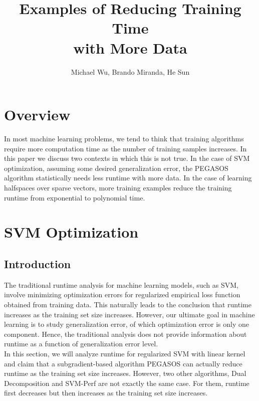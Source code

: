 \documentclass[11pt,a4paper]{article}
\title{Examples of Reducing Training Time\\ with More Data}
\author{Michael Wu, Brando Miranda, He Sun}
\begin{document}
\maketitle

\section{Overview}

	In most machine learning problems, we tend to think that training algorithms require more computation time as the number of training samples increases. In this paper we discuss two contexts in which this is not true. In the case of SVM optimization, assuming some desired generalization error, the PEGASOS algorithm statistically needs less runtime with more data. In the case of learning halfspaces over sparse vectors, more training examples reduce the training runtime from exponential to polynomial time.


\section{SVM Optimization}

\subsection{Introduction}

The traditional runtime analysis for machine learning models, such as SVM, involve minimizing optimization errors for regularized empirical loss function obtained from training data. This naturally leads to the conclusion that runtime increases as the training set size increases. However, our ultimate goal in machine learning is to study generalization error, of which optimization error is only one component. Hence, the traditional analysis does not provide information about runtime as a function of generalization error level. \\

In this section, we will analyze runtime for regularized SVM with linear kernel and claim that a subgradient-based algorithm PEGASOS can actually reduce runtime as the training set size increases. However, two other algorithms, Dual Decomposition and SVM-Perf are not exactly the same case. For them, runtime first decreases but then increases as the training set size increases. \\
\end{document}
